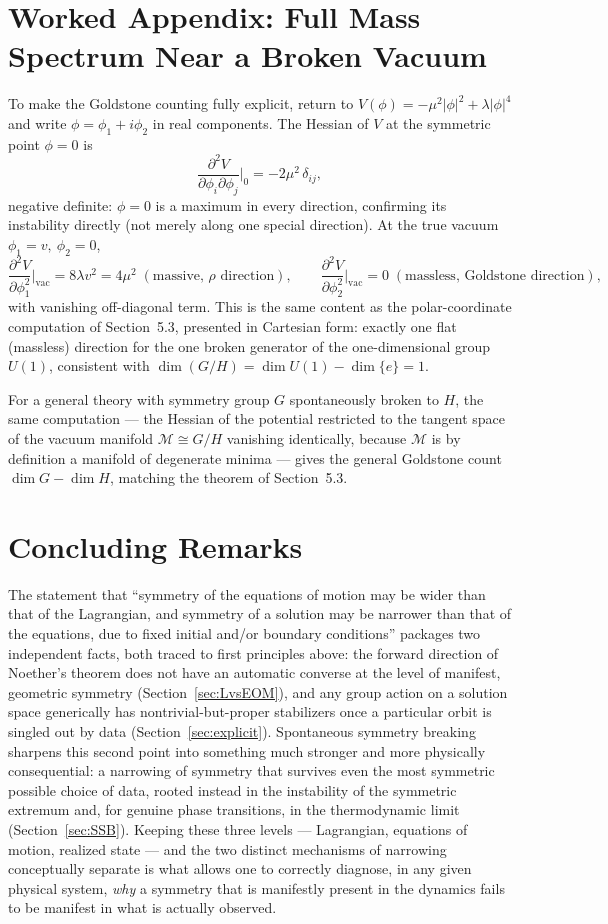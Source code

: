 \section{Worked Appendix: Full Mass Spectrum Near a Broken Vacuum}

To make the Goldstone counting fully explicit, return to $V(\phi) =
-\mu^2|\phi|^2+\lambda|\phi|^4$ and write $\phi = \phi_1+i\phi_2$ in real
components. The Hessian of $V$ at the symmetric point $\phi=0$ is
\[
\frac{\partial^2 V}{\partial\phi_i\partial\phi_j}\Big|_{0} = -2\mu^2\,\delta_{ij},
\]
negative definite: $\phi=0$ is a maximum in every direction, confirming its
instability directly (not merely along one special direction). At the true
vacuum $\phi_1=v,\ \phi_2=0$,
\[
\frac{\partial^2V}{\partial\phi_1^2}\Big|_{\text{vac}} = 8\lambda v^2 = 4\mu^2 \;(\text{massive, } \rho \text{ direction}), \qquad
\frac{\partial^2V}{\partial\phi_2^2}\Big|_{\text{vac}} = 0 \;(\text{massless, Goldstone direction}),
\]
with vanishing off-diagonal term. This is the same content as the
polar-coordinate computation of Section~5.3, presented in Cartesian form:
exactly one flat (massless) direction for the one broken generator of the
one-dimensional group $U(1)$, consistent with $\dim(G/H) = \dim U(1) -
\dim\{e\} = 1$.

For a general theory with symmetry group $G$ spontaneously broken to $H$, the
same computation — the Hessian of the potential restricted to the tangent space
of the vacuum manifold $\mathcal M \cong G/H$ vanishing identically, because
$\mathcal M$ is by definition a manifold of degenerate minima — gives the
general Goldstone count $\dim G - \dim H$, matching the theorem of Section~5.3.

\section{Concluding Remarks}

The statement that ``symmetry of the equations of motion may be wider than that
of the Lagrangian, and symmetry of a solution may be narrower than that of the
equations, due to fixed initial and/or boundary conditions'' packages two
independent facts, both traced to first principles above: the forward direction
of Noether's theorem does not have an automatic converse at the level of
manifest, geometric symmetry (Section~\ref{sec:LvsEOM}), and any group action
on a solution space generically has nontrivial-but-proper stabilizers once a
particular orbit is singled out by data (Section~\ref{sec:explicit}).
Spontaneous symmetry breaking sharpens this second point into something much
stronger and more physically consequential: a narrowing of symmetry that
survives even the most symmetric possible choice of data, rooted instead in the
instability of the symmetric extremum and, for genuine phase transitions, in
the thermodynamic limit (Section~\ref{sec:SSB}). Keeping these three levels —
Lagrangian, equations of motion, realized state — and the two distinct
mechanisms of narrowing conceptually separate is what allows one to correctly
diagnose, in any given physical system, \emph{why} a symmetry that is
manifestly present in the dynamics fails to be manifest in what is actually
observed.

